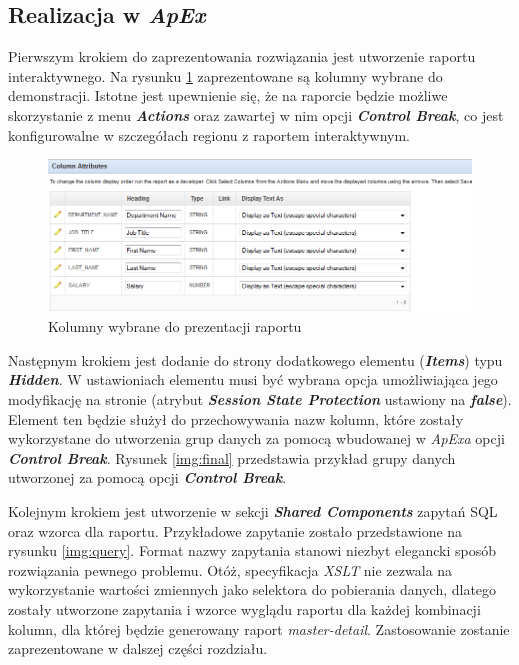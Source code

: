 \documentclass[11pt,a4paper]{article}
\begin{document}
\subsection{Realizacja w \emph{ApEx}} \label{test:apex}
Pierwszym krokiem do zaprezentowania rozwiązania jest utworzenie raportu interaktywnego. Na rysunku \ref{img:raport_ir_dane} zaprezentowane są kolumny wybrane do demonstracji. Istotne jest upewnienie się, że na raporcie będzie możliwe skorzystanie z menu \emph{\textbf{Actions}} oraz zawartej w nim opcji \emph{\textbf{Control Break}}, co jest konfigurowalne w szczegółach regionu z raportem interaktywnym. 

\begin{figure}[h]
\centering
\includegraphics[scale=0.7]{ir_dane}
\caption{Kolumny wybrane do prezentacji raportu}
\label{img:raport_ir_dane}
\end{figure}


Następnym krokiem jest dodanie do strony dodatkowego elementu (\emph{\textbf{Items}}) typu \emph{\textbf{Hidden}}. W ustawioniach elementu musi być wybrana opcja umożliwiająca jego modyfikację na stronie (atrybut \emph{\textbf{Session State Protection}} ustawiony na \emph{\textbf{false}}). Element ten będzie służył do przechowywania nazw kolumn, które zostały wykorzystane do utworzenia grup danych za pomocą wbudowanej w \emph{ApExa} opcji \emph{\textbf{Control Break}}.  Rysunek \ref{img:final} przedstawia przykład grupy danych utworzonej za pomocą opcji \emph{\textbf{Control Break}}.



Kolejnym krokiem jest utworzenie w sekcji \emph{\textbf{Shared Components}} zapytań SQL oraz wzorca dla raportu. Przykładowe zapytanie zostało przedstawione na rysunku \ref{img:query}. Format nazwy zapytania stanowi niezbyt elegancki sposób rozwiązania pewnego problemu. Otóż, specyfikacja \emph{XSLT} nie zezwala na wykorzystanie wartości zmiennych jako selektora do pobierania danych, dlatego zostały utworzone zapytania i wzorce wyglądu raportu dla każdej kombinacji kolumn, dla której będzie generowany raport \emph{master-detail}. Zastosowanie zostanie zaprezentowane w dalszej części rozdziału. 
\end{document}
